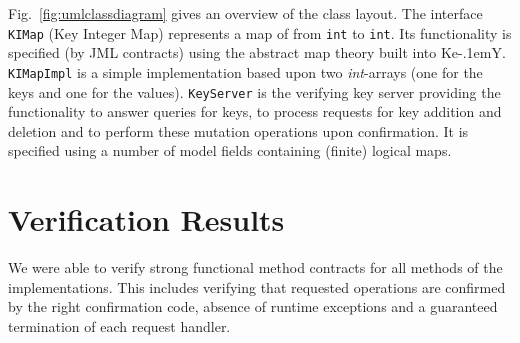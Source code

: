 \documentclass{llncs}
\newcommand{\KeY}{Ke\kern-.1emY\xspace}
\begin{document}
Fig.~\ref{fig:umlclassdiagram} gives an overview of the class layout.
%
The interface \texttt{KIMap} (Key Integer Map) represents a map of
from \texttt{int} to \texttt{int}. Its functionality is specified (by
JML contracts) using the abstract map theory built into
\KeY. \texttt{KIMapImpl} is a simple implementation based upon two
\emph{int}-arrays (one for the keys and one for the values).
%
\texttt{KeyServer} is the verifying key server
providing the functionality to answer queries for keys, to process
requests for key addition and deletion and to perform these
mutation operations upon confirmation. It is specified using a
number of model fields containing (finite) logical maps.
%

\section{Verification Results}

We were able to verify strong functional method contracts for all
methods of the implementations. This includes verifying that requested
operations are confirmed by the right confirmation code,
absence of runtime
exceptions and a guaranteed termination of each request handler.
\end{document}
